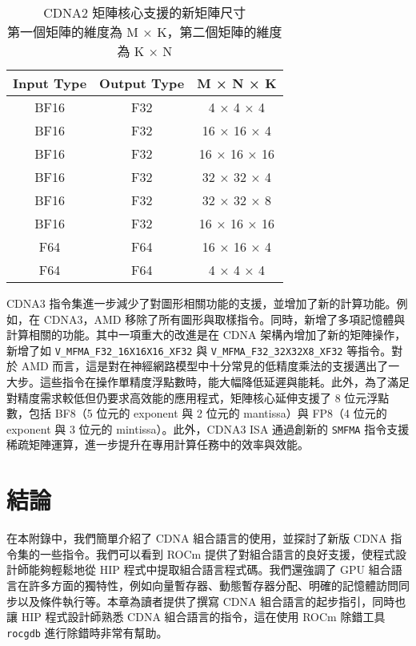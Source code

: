 \begin{table}[h!]
\centering
\caption{CDNA2 矩陣核心支援的新矩陣尺寸\\
第一個矩陣的維度為 M × K，第二個矩陣的維度為 K × N}
\label{tab:matrix_sizes_cdna2}
\begin{tabular}{ccc}
\hline
\textbf{Input Type} & \textbf{Output Type} & \textbf{M × N × K} \\ \hline
BF16 & F32 & 4 × 4 × 4 \\
BF16 & F32 & 16 × 16 × 4 \\
BF16 & F32 & 16 × 16 × 16 \\
BF16 & F32 & 32 × 32 × 4 \\
BF16 & F32 & 32 × 32 × 8 \\
BF16 & F32 & 16 × 16 × 16 \\
F64  & F64 & 16 × 16 × 4 \\
F64  & F64 & 4 × 4 × 4 \\
\hline
\end{tabular}
\end{table}

CDNA3 指令集進一步減少了對圖形相關功能的支援，並增加了新的計算功能。例如，在 CDNA3，AMD 移除了所有圖形與取樣指令。同時，新增了多項記憶體與計算相關的功能。其中一項重大的改進是在 CDNA 架構內增加了新的矩陣操作，新增了如 \lstinline|V_MFMA_F32_16X16X16_XF32| 與 \lstinline|V_MFMA_F32_32X32X8_XF32| 等指令。對於 AMD 而言，這是對在神經網路模型中十分常見的低精度乘法的支援邁出了一大步。這些指令在操作單精度浮點數時，能大幅降低延遲與能耗。此外，為了滿足對精度需求較低但仍要求高效能的應用程式，矩陣核心延伸支援了 8 位元浮點數，包括 BF8（5 位元的 exponent 與 2 位元的 mantissa）與 FP8（4 位元的 exponent 與 3 位元的 mintissa）。此外，CDNA3 ISA 通過創新的 \lstinline|SMFMA| 指令支援稀疏矩陣運算，進一步提升在專用計算任務中的效率與效能。


\section{結論}
在本附錄中，我們簡單介紹了 CDNA 組合語言的使用，並探討了新版 CDNA 指令集的一些指令。我們可以看到 ROCm 提供了對組合語言的良好支援，使程式設計師能夠輕鬆地從 HIP 程式中提取組合語言程式碼。我們還強調了 GPU 組合語言在許多方面的獨特性，例如向量暫存器、動態暫存器分配、明確的記憶體訪問同步以及條件執行等。本章為讀者提供了撰寫 CDNA 組合語言的起步指引，同時也讓 HIP 程式設計師熟悉 CDNA 組合語言的指令，這在使用 ROCm 除錯工具 \lstinline|rocgdb| 進行除錯時非常有幫助。
